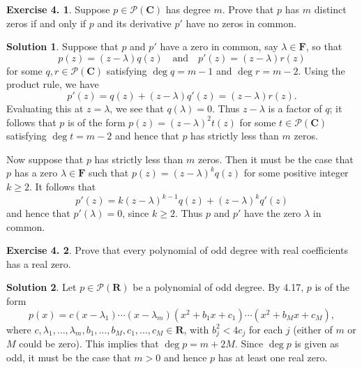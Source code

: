 \documentclass[12pt]{article}
\theoremstyle{definition}
\theoremstyle{exercise}
\newtheorem{exercise}{Exercise 4.}
\theoremstyle{solution}
\newtheorem*{solution}{Solution}
\newcommand{\poly}{\mathcal{P}}
\newcommand{\quand}{\quad \text{and} \quad}
\newcommand{\R}{\mathbf{R}}
\newcommand{\C}{\mathbf{C}}
\newcommand{\F}{\mathbf{F}}
\begin{document}
\begin{exercise}
\label{ex:6}
    Suppose \( p \in \poly(\C) \) has degree \( m \). Prove that \( p \) has \( m \) distinct zeros if and only if \( p \) and its derivative \( p' \) have no zeros in common.
\end{exercise}

\begin{solution}
    Suppose that \( p \) and \( p' \) have a zero in common, say \( \lambda \in \F \), so that
    \[
        p(z) = (z - \lambda) q(z) \quand p'(z) = (z - \lambda) r(z)
    \]
    for some \( q, r \in \poly(\C) \) satisfying \( \deg q = m - 1 \) and \( \deg r = m - 2 \). Using the product rule, we have
    \[
        p'(z) = q(z) + (z - \lambda) q'(z) = (z - \lambda) r(z).
    \]
    Evaluating this at \( z = \lambda \), we see that \( q(\lambda) = 0 \). Thus \( z - \lambda \) is a factor of \( q \); it follows that \( p \) is of the form \( p(z) = (z - \lambda)^2 t(z) \) for some \( t \in \poly(\C) \) satisfying \( \deg t = m - 2 \) and hence that \( p \) has strictly less than \( m \) zeros.

    Now suppose that \( p \) has strictly less than \( m \) zeros. Then it must be the case that \( p \) has a zero \( \lambda \in \F \) such that \( p(z) = (z - \lambda)^k q(z) \) for some positive integer \( k \geq 2 \). It follows that
    \[
        p'(z) = k(z - \lambda)^{k-1} q(z) + (z - \lambda)^k q'(z)
    \]
    and hence that \( p'(\lambda) = 0 \), since \( k \geq 2 \). Thus \( p \) and \( p' \) have the zero \( \lambda \) in common.
\end{solution}

\begin{exercise}
\label{ex:7}
    Prove that every polynomial of odd degree with real coefficients has a real zero.
\end{exercise}

\begin{solution}
    Let \( p \in \poly(\R) \) be a polynomial of odd degree. By 4.17, \( p \) is of the form
    \[
        p(x) = c(x - \lambda_1) \cdots (x - \lambda_m) (x^2 + b_1 x + c_1) \cdots (x^2 + b_M x + c_M),
    \]
    where \( c, \lambda_1, \ldots, \lambda_m, b_1, \ldots, b_M, c_1, \ldots, c_M \in \R \), with \( b_j^2 < 4 c_j \) for each \( j \) (either of \( m \) or \( M \) could be zero). This implies that \( \deg p = m + 2M \). Since \( \deg p \) is given as odd, it must be the case that \( m > 0 \) and hence \( p \) has at least one real zero.
\end{solution}
\end{document}
